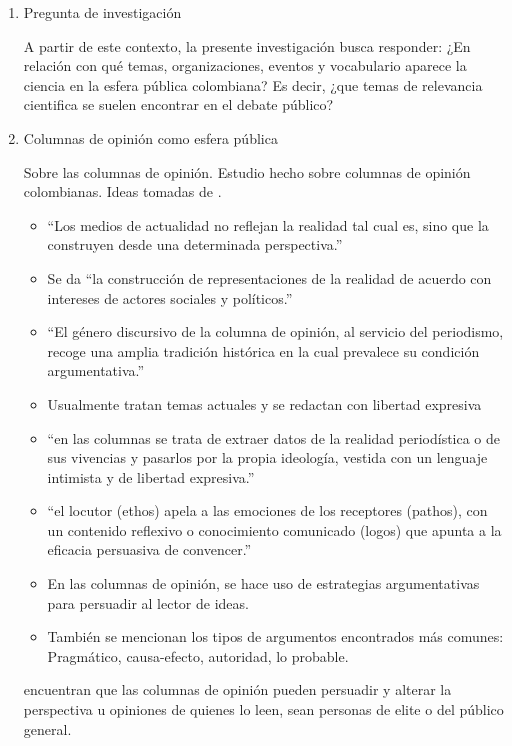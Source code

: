 \documentclass[11pt,a4paper]{article}
\begin{document}
\begin{enumerate}
		
		\item Pregunta de investigación
		
		
		A partir de este contexto, la presente investigación busca responder:
		¿En relación con qué temas, organizaciones, eventos y vocabulario aparece la ciencia en la esfera pública colombiana?
		Es decir, ¿que temas de relevancia cientifica se suelen encontrar en el debate público?
		
		
		\item Columnas de opinión como esfera pública
		
		Sobre las columnas de opinión. Estudio hecho sobre columnas de opinión colombianas. Ideas tomadas de \cite{CaroLopera2020}.
		
		\begin{itemize}
			\item ``Los medios de actualidad no reflejan la realidad tal cual es, sino que la construyen desde una determinada perspectiva.''
			\item Se da ``la construcción de representaciones de la realidad de acuerdo con intereses de actores sociales y políticos.''
			\item ``El género discursivo de la columna de opinión, al servicio del periodismo, recoge
			una amplia tradición histórica en la cual prevalece su condición argumentativa.''
			\item Usualmente tratan temas actuales y se redactan con libertad expresiva
			\item ``en las columnas se trata de extraer datos de la realidad periodística o de sus vivencias y
			pasarlos por la propia ideología, vestida con un lenguaje intimista y de libertad expresiva.''
			\item ``el locutor (ethos) apela a las emociones de los receptores (pathos), con un contenido reflexivo o conocimiento comunicado (logos) que apunta a la eficacia persuasiva de convencer.''
			\item En las columnas de opinión, se hace uso de estrategias argumentativas para persuadir al lector de ideas.
			\item También se mencionan los tipos de argumentos encontrados más comunes: Pragmático, causa-efecto, autoridad, lo probable. 
		\end{itemize}
		
		\cite{Coppock2018} encuentran que las columnas de opinión pueden persuadir y alterar la perspectiva u opiniones de quienes lo leen, sean personas de elite o del público general.
		

\end{enumerate}
\end{document}
